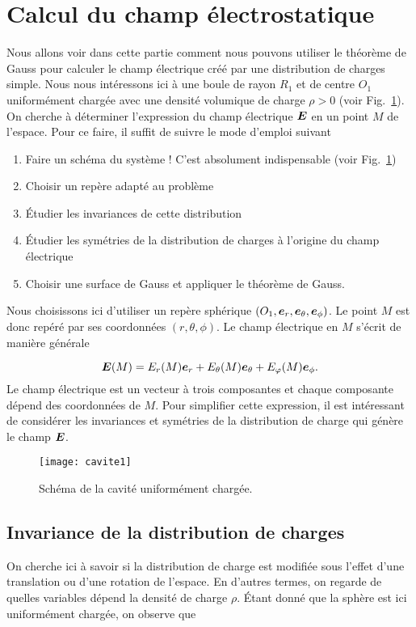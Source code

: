 \section{Calcul du champ électrostatique}
\label{sec:calcul_e}
Nous allons voir dans cette partie comment nous pouvons utiliser le théorème de
Gauss pour calculer le champ électrique créé 
par une distribution de charges simple. Nous nous intéressons ici à une boule de
rayon $R_1$ et de centre $O_1$ uniformément chargée avec une densité volumique
de charge $\rho > 0$ (voir Fig.~\ref{fig:cavite1}). On cherche à déterminer 
l'expression du champ électrique $\vece$ en un point $M$ de l'espace. Pour ce faire, 
il suffit de suivre le mode d'emploi suivant
\begin{enumerate}
	\item Faire un schéma du système ! C'est absolument indispensable
	  (voir Fig.~\ref{fig:cavite1})
	\item Choisir un repère adapté au problème
	\item Étudier les invariances de cette distribution
	\item Étudier les symétries de la distribution de charges à l'origine 
	  du champ électrique
	\item Choisir une surface de Gauss et appliquer le théorème de Gauss.
\end{enumerate}

Nous choisissons ici d'utiliser un repère sphérique $(O_1, \er, \etheta, \ephi)$.
Le point $M$ est donc repéré par ses coordonnées $(r, \theta, \phi)$. Le champ
électrique en $M$ s'écrit de manière générale

\begin{equation}
	\vece(M) = E_r(M)\er + E_\theta(M)\etheta + E_\varphi(M)\ephi.
	\label{eq:cavite1}
\end{equation}
Le champ électrique est un vecteur à trois composantes et chaque composante
dépend des coordonnées de $M$. Pour simplifier cette expression, il est intéressant
de considérer les invariances et symétries de la distribution de charge qui génère
le champ $\vece$.

\begin{figure}
	\centering
	\texttt{[image: cavite1]}
	\caption{Schéma de la cavité uniformément chargée.}%
	\label{fig:cavite1}
\end{figure}

\subsection{Invariance de la distribution de charges}
On cherche ici à savoir si la distribution de charge est modifiée sous l'effet
d'une translation ou d'une rotation de l'espace. En d'autres termes, on regarde
de quelles variables dépend la densité de charge $\rho$. Étant donné que la
sphère est ici uniformément chargée, on observe que

